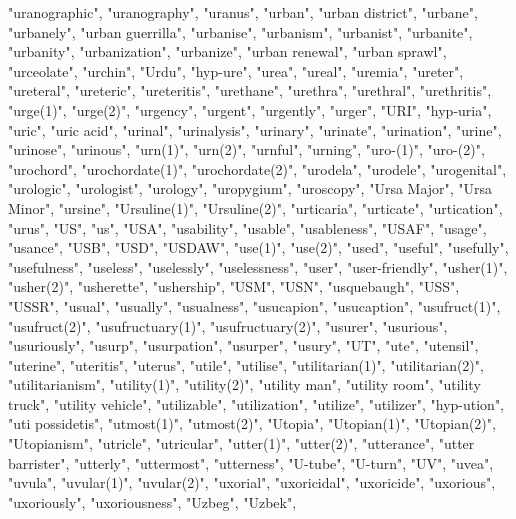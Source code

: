 "uranographic",
"uranography",
"uranus",
"urban",
"urban district",
"urbane",
"urbanely",
"urban guerrilla",
"urbanise",
"urbanism",
"urbanist",
"urbanite",
"urbanity",
"urbanization",
"urbanize",
"urban renewal",
"urban sprawl",
"urceolate",
"urchin",
"Urdu",
"hyp-ure",
"urea",
"ureal",
"uremia",
"ureter",
"ureteral",
"ureteric",
"ureteritis",
"urethane",
"urethra",
"urethral",
"urethritis",
"urge(1)",
"urge(2)",
"urgency",
"urgent",
"urgently",
"urger",
"URI",
"hyp-uria",
"uric",
"uric acid",
"urinal",
"urinalysis",
"urinary",
"urinate",
"urination",
"urine",
"urinose",
"urinous",
"urn(1)",
"urn(2)",
"urnful",
"urning",
"uro-(1)",
"uro-(2)",
"urochord",
"urochordate(1)",
"urochordate(2)",
"urodela",
"urodele",
"urogenital",
"urologic",
"urologist",
"urology",
"uropygium",
"uroscopy",
"Ursa Major",
"Ursa Minor",
"ursine",
"Ursuline(1)",
"Ursuline(2)",
"urticaria",
"urticate",
"urtication",
"urus",
"US",
"us",
"USA",
"usability",
"usable",
"usableness",
"USAF",
"usage",
"usance",
"USB",
"USD",
"USDAW",
"use(1)",
"use(2)",
"used",
"useful",
"usefully",
"usefulness",
"useless",
"uselessly",
"uselessness",
"user",
"user-friendly",
"usher(1)",
"usher(2)",
"usherette",
"ushership",
"USM",
"USN",
"usquebaugh",
"USS",
"USSR",
"usual",
"usually",
"usualness",
"usucapion",
"usucaption",
"usufruct(1)",
"usufruct(2)",
"usufructuary(1)",
"usufructuary(2)",
"usurer",
"usurious",
"usuriously",
"usurp",
"usurpation",
"usurper",
"usury",
"UT",
"ute",
"utensil",
"uterine",
"uteritis",
"uterus",
"utile",
"utilise",
"utilitarian(1)",
"utilitarian(2)",
"utilitarianism",
"utility(1)",
"utility(2)",
"utility man",
"utility room",
"utility truck",
"utility vehicle",
"utilizable",
"utilization",
"utilize",
"utilizer",
"hyp-ution",
"uti possidetis",
"utmost(1)",
"utmost(2)",
"Utopia",
"Utopian(1)",
"Utopian(2)",
"Utopianism",
"utricle",
"utricular",
"utter(1)",
"utter(2)",
"utterance",
"utter barrister",
"utterly",
"uttermost",
"utterness",
"U-tube",
"U-turn",
"UV",
"uvea",
"uvula",
"uvular(1)",
"uvular(2)",
"uxorial",
"uxoricidal",
"uxoricide",
"uxorious",
"uxoriously",
"uxoriousness",
"Uzbeg",
"Uzbek",
